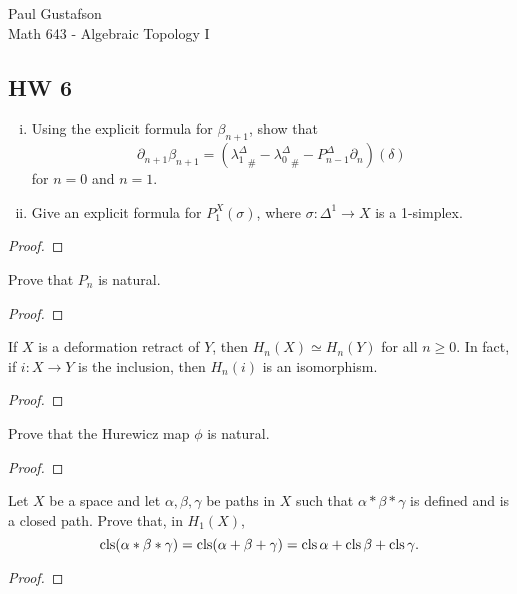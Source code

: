 \documentclass{article}
\begin{document}
\noindent Paul Gustafson\\
\noindent Math 643 - Algebraic Topology I

\subsection*{HW 6}
 \begin{enumerate}[(i)]
\item Using the explicit formula for $\beta_{n+1}$, show that
$$\partial_{n+1} \beta_{n+1} = ( {\lambda_1^\Delta}_\# - {\lambda_0^\Delta}_\# - P^\Delta_{n-1} \partial_n)(\delta)$$
for $n = 0$ and $n=1$.
\item Give an explicit formula for $P_1^X(\sigma)$, where $\sigma: \Delta^1 \to X$ is a 1-simplex.
\end{enumerate}
\begin{proof}
\end{proof}

 Prove that $P_n$ is natural.
\begin{proof}
\end{proof}

 If $X$ is a deformation retract of $Y$, then $H_n(X) \simeq H_n(Y)$ for all $n \ge 0$. In fact, if
$i: X \to Y$ is the inclusion, then $H_n(i)$ is an isomorphism.
\begin{proof}
\end{proof}

 Prove that the Hurewicz map $\phi$ is natural.
\begin{proof}
\end{proof}

 Let $X$ be a space and let $\alpha, \beta, \gamma$ be paths in $X$ such that $\alpha * \beta * \gamma$ is defined and is a 
closed path. Prove that, in $H_1(X)$,
$$\operatorname{cls}(\alpha * \beta * \gamma) = \operatorname{cls}(\alpha + \beta + \gamma) = \operatorname{cls} \alpha + \operatorname{cls} \beta + \operatorname{cls} \gamma.$$
\begin{proof}
\end{proof}
\end{document}
